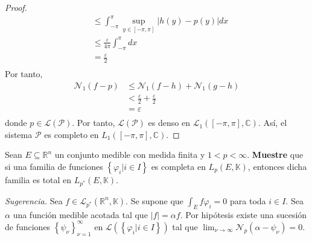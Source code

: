 \documentclass[12pt]{report}
\theoremstyle{largebreak}
\newcommand\abs[1]{\ensuremath{\left|#1\right|}}
\newcommand{\N}[2]{\ensuremath{\mathcal{N}_{#1}\left(#2\right)}}
\begin{document}
\begin{proof}
\begin{equation*}
\begin{split}
                &\leq\int_{-\pi}^\pi\sup_{ y\in[-\pi,\pi]}\abs{h(y)-p(y)}dx\\
                &\leq\frac{\varepsilon}{4\pi}\int_{-\pi}^\pi dx\\
                &=\frac{\varepsilon}{2}\\
            \end{split}
        \end{equation*}
        Por tanto,
        \begin{equation*}
            \begin{split}
                \N{1}{f-p}&\leq\N{1}{f-h}+\N{1}{g-h}\\
                &<\frac{\varepsilon}{2}+\frac{\varepsilon}{2}\\
                &=\varepsilon\\
            \end{split}
        \end{equation*}
        donde $p\in\mathcal{L}(\mathcal{P})$. Por tanto, $\mathcal{L}(\mathcal{P})$ es denso en $\mathcal{L}_1([-\pi,\pi],\mathbb{C})$. Así, el sistema $\mathcal{P}$ es completo en $L_1([-\pi,\pi],\mathbb{C})$.

    \end{proof}

    \begin{excer}
        Sean $E\subseteq\mathbb{R}^n$ un conjunto medible con medida finita y $1<p<\infty$. \textbf{Muestre} que si una familia de funciones $\left\{\varphi_i\Big|i\in I \right\}$ es completa en $L_p(E,\mathbb{K})$, entonces dicha familia es total en $L_{p^*}(E,\mathbb{K})$.

        \textit{Sugerencia.} Sea $f\in\mathcal{L}_{p^*}(\mathbb{R}^n,\mathbb{K})$. Se supone que $\int_Ef\varphi_i=0$ para toda $i\in I$. Sea $\alpha$ una función medible acotada tal que $\abs{f}=\alpha f$. Por hipótesis existe una sucesión de funciones $\left\{\psi_\nu \right\}_{\nu=1}^\infty$ en $\mathcal{L}(\left\{\varphi_i\Big|i\in I \right\})$ tal que $\lim_{\nu\rightarrow\infty}\N{p}{\alpha-\psi_\nu}=0$.
    \end{excer}
\end{document}
